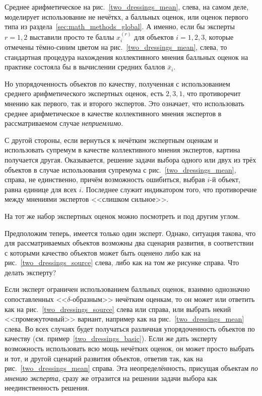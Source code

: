 Среднее арифметическое на рис.~\ref{two_dressings_mean}, слева, на самом деле, моделирует использование не нечёткх, а балльных оценок, или оценок первого типа из раздела~\ref{sec:math_methods_global}. А именно, если бы эксперты $r=1,2$ выставили просто те баллы $x_i^{(r)}$ для объектов $i=1,2,3$, которые отмечены тёмно-синим цветом на рис.~\ref{two_dressings_mean}, слева, то стандартная процедура нахождения коллективного мнения балльных оценок на практике состояла бы в вычислении средних баллов $\bar{x}_i$. 

Но упорядоченность объектов по качеству, полученная с использованием среднего арифметического экспертных оценок, есть $2, 3, 1$, что противоречит мнению как первого, так и второго экспертов. Это означает, что использовать среднее арифметическое в качестве коллективного мнения экспертов в рассматриваемом случае {\sl неприемлимо}.

С другой стороны, если вернуться к нечётким экспертным оценкам и использовать супремум в качестве коллективного мнения экспертов, картина получается другая. Оказывается, решение задачи выбора одного или двух из трёх объектов в случае использования супремума с рис.~\ref{two_dressings_mean}, справа, не единственно, причём возможность ошибиться, выбрав $i$-й объект, равна единице для всех $i$. Последнее служит индикатором того, что противоречие между мнениями экспертов <<слишком сильное>>.

На тот же набор экспертных оценок можно посмотреть и под другим углом.
\begin{example}
\label{two_dressings_basic2}
Предположим теперь, имеется только один эксперт. Однако, ситуация такова, что для рассматриваемых объектов возможны два сценария развития, в соответствии с которыми качество объектов может быть оценено либо как на рис.~\ref{two_dressings_source} слева, либо как на том же рисунке справа. Что делать эксперту?
\end{example}

Если эксперт ограничен использованием балльных оценок, взаимно однозначно сопоставленных <<$\delta$-образным>> нечётким оценкам, то он может или ответить как на рис.~\ref{two_dressings_source} слева или справа, или выбрать некий <<промежуточный>> вариант, например как на рис.~\ref{two_dressings_mean} слева. Во всех случаях будет получаться различная упорядоченность объектов по качеству (см. пример~\ref{two_dressings_basic}). Если же дать эксперту возможность использовать всю мощь нечётких оценок, он может просто выбрать и тот, и другой сценарий развития объектов, ответив так, как на  рис.~\ref{two_dressings_mean} справа. Эта неопределённость, присущая объектам {\sl по мнению эксперта}, сразу же отразится на решении задачи выбора как неединственность решения.

